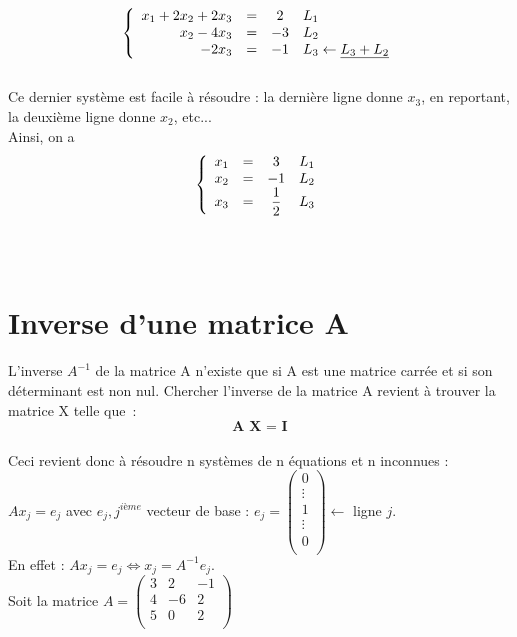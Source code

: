 \documentclass[a4paper,12pt]{report}
\begin{document}
\[
\left\{
\begin{array}{r c c l}
x_1+2x_2+2x_3 &=&2&L_1\\
x_2-4x_3&=&-3&L_2\\
-2x_3&=&-1&L_3\leftarrow \underline{L_3+L_2}
\end{array}
\right.
\]\\
Ce dernier système est facile à résoudre : la dernière ligne donne $x_3$, en reportant, la deuxième ligne donne $x_2$, etc...\\
Ainsi, on a $$\left\{
\begin{array}{r c c l}
x_1&=&3&L_1\\
x_2&=&-1&L_2\\
x_3&=&\dfrac{1}{2}&L_3\\
\end{array}
\right.
$$
\\
\\

\newpage

\section{Inverse d'une matrice A} 
L’inverse $A^{-1}$ de la matrice A n’existe que si A est une matrice carrée et si son déterminant est non nul. Chercher l’inverse de la matrice A revient à trouver la matrice X telle que :\\
$$\textbf{A X = I}$$\\
Ceci revient donc à résoudre n systèmes de n équations et n inconnues :\\
 $A x_{j} = e_{j}$ avec $ e_{j}, j^{ième}$ vecteur de base : $e_{j}=
\begin{pmatrix}
0\\
\vdots\\
1\\
\vdots\\
0\\
\end{pmatrix} \leftarrow$ ligne $j$.\\
En effet : $Ax_{j}=e_{j} \Leftrightarrow x_{j}=A^{-1}e_{j}$.\\

Soit la matrice $
A =\begin{pmatrix}
3 & 2 & -1 \\
4 & -6 & 2\\
5 & 0 & 2\\
\end{pmatrix} $\\
\end{document}
